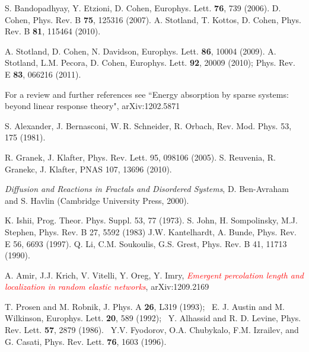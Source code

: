 \documentclass[aps,prb,floats,floatfix,twocolumn]{revtex4}
\newcommand{\rmrk}[1]{\textcolor{red}{#1}}
\begin{document}
\begin{thebibliography}{99}

%
S. Bandopadhyay, Y. Etzioni, D. Cohen,
Europhys. Lett. {\bf 76}, 739 (2006).
%
D. Cohen,
Phys. Rev. B {\bf 75}, 125316 (2007).
%
A. Stotland, T. Kottos, D. Cohen, 
Phys. Rev. B {\bf 81}, 115464 (2010). 


%
A. Stotland, D. Cohen, N. Davidson, 
Europhys. Lett. {\bf 86}, 10004 (2009).
%
A. Stotland, L.M. Pecora, D. Cohen, 
Europhys. Lett. {\bf 92}, 20009 (2010);
Phys. Rev. E {\bf 83}, 066216 (2011).


For a review and further references 
see ``Energy absorption by sparse systems: 
beyond linear response theory",	arXiv:1202.5871  


S. Alexander, J. Bernasconi, W. R. Schneider, R. Orbach, 
Rev. Mod. Phys. 53, 175 (1981).

R. Granek, J. Klafter, Phys. Rev. Lett. 95, 098106 (2005).
S. Reuvenia, R. Granekc, J. Klafter, PNAS 107, 13696 (2010).

{\em Diffusion and Reactions in Fractals and Disordered Systems},
D. Ben-Avraham and S. Havlin (Cambridge University Press, 2000).

K. Ishii, 
Prog. Theor. Phys. Suppl. 53, 77 (1973).
%
%
S. John, H. Sompolinsky, M.J. Stephen,  
Phys. Rev. B 27, 5592 (1983) 
%
%
J.W. Kantelhardt, A. Bunde, 
Phys. Rev. E 56, 6693 (1997).
%
%
Q. Li, C.M. Soukoulis, G.S. Grest,
Phys. Rev. B 41, 11713 (1990).  


A. Amir, J.J. Krich, V. Vitelli, Y. Oreg, Y. Imry, 
\rmrk{{\em Emergent percolation length and localization in random elastic networks}},
arXiv:1209.2169



T. Prosen and M. Robnik, J. Phys. A {\bf 26}, L319 (1993); \
E. J. Austin and M. Wilkinson, Europhys. Lett. {\bf 20}, 589 (1992); \ 
Y. Alhassid and R. D. Levine, Phys. Rev. Lett. {\bf 57}, 2879 (1986). \
Y.V. Fyodorov, O.A. Chubykalo, F.M. Izrailev, and G. Casati, 
Phys. Rev. Lett. {\bf 76}, 1603 (1996).


\end{thebibliography}
\end{document}
